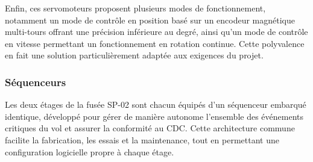 \vspace{0.5cm}

Enfin, ces servomoteurs proposent plusieurs modes de fonctionnement, notamment un mode de contrôle en position basé sur un
encodeur magnétique multi-tours offrant une précision inférieure au degré, ainsi qu’un mode de contrôle en vitesse permettant
un fonctionnement en rotation continue. Cette polyvalence en fait une solution particulièrement adaptée aux exigences du projet.


\subsubsection{Séquenceurs}

Les deux étages de la fusée SP-02 sont chacun équipés d’un séquenceur embarqué identique, développé pour gérer de manière
autonome l’ensemble des événements critiques du vol et assurer la conformité au \acrshort{CDC}\cite{CDC_BiEtage}. Cette
architecture commune facilite la fabrication, les essais et la maintenance, tout en permettant une configuration logicielle
propre à chaque étage.\\



